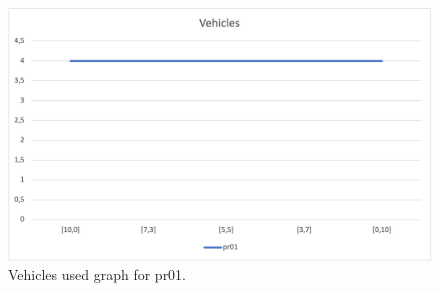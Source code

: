 \begin{figure}[H]
    \centering
    \includegraphics[width=1.0\columnwidth]{../graphs/pr01-vehicles.png}
    \caption{Vehicles used graph for pr01.}
\end{figure}
